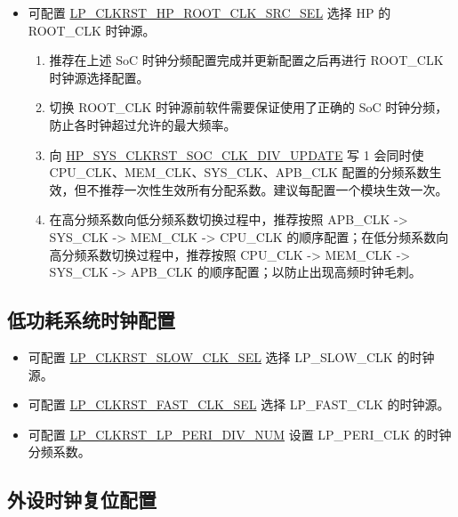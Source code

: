 \documentclass[main\_\_CN.tex]{subfiles}
\begin{document}
\begin{itemize}
\item 可配置 \hyperref[fielddesc:LPCLKRSTHPROOTCLKSRCSEL]{LP\_CLKRST\_HP\_ROOT\_CLK\_SRC\_SEL} 选择 HP 的 ROOT\_CLK 时钟源。

\begin{importantlisting}
\vspace{-0.5em}
\begin{enumerate}
    \item 推荐在上述 SoC 时钟分频配置完成并更新配置之后再进行 ROOT\_CLK 时钟源选择配置。
    \item 切换 ROOT\_CLK 时钟源前软件需要保证使用了正确的 SoC 时钟分频，防止各时钟超过允许的最大频率。
    \item 向 \hyperref[fielddesc:HPSYSCLKRSTSOCCLKDIVUPDATE]{HP\_SYS\_CLKRST\_SOC\_CLK\_DIV\_UPDATE} 写 1 会同时使 CPU\_CLK、MEM\_CLK、SYS\_CLK、APB\_CLK 配置的分频系数生效，但不推荐一次性生效所有分配系数。建议每配置一个模块生效一次。
    \item 在高分频系数向低分频系数切换过程中，推荐按照 APB\_CLK -> SYS\_CLK -> MEM\_CLK -> CPU\_CLK 的顺序配置；在低分频系数向高分频系数切换过程中，推荐按照 CPU\_CLK -> MEM\_CLK -> SYS\_CLK -> APB\_CLK 的顺序配置；以防止出现高频时钟毛刺。
\end{enumerate}
\end{importantlisting}

\end{itemize}


\subsection{低功耗系统时钟配置}

\begin{itemize}
\item 可配置 \hyperref[fielddesc:LPCLKRSTSLOWCLKSEL]{LP\_CLKRST\_SLOW\_CLK\_SEL} 选择 LP\_SLOW\_CLK 的时钟源。

\item 可配置 \hyperref[fielddesc:LPCLKRSTFASTCLKSEL]{LP\_CLKRST\_FAST\_CLK\_SEL} 选择 LP\_FAST\_CLK 的时钟源。

\item 可配置 \hyperref[fielddesc:LPCLKRSTLPPERIDIVNUM]{LP\_CLKRST\_LP\_PERI\_DIV\_NUM} 设置 LP\_PERI\_CLK 的时钟分频系数。
\end{itemize}

\subsection{外设时钟复位配置}
\end{document}
